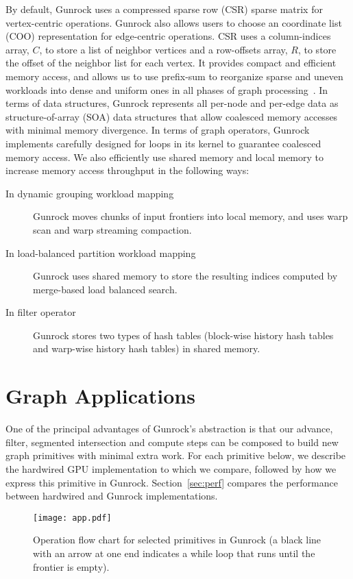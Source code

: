 \documentclass[format=acmsmall,review=false,screen=true]{acmart}
\begin{document}
By default, Gunrock uses a compressed sparse row (CSR) sparse matrix
for vertex-centric operations. Gunrock also allows users to choose an
coordinate list (COO) representation for edge-centric operations. CSR
uses a column-indices array, $C$, to store a list of neighbor vertices
and a row-offsets array, $R$, to store the offset of the neighbor list
for each vertex. It provides compact and efficient memory access, and
allows us to use prefix-sum to reorganize sparse and uneven workloads
into dense and uniform ones in all phases of graph
processing~\cite{Merrill:2012:SGG}. In terms of data structures,
Gunrock represents all per-node and per-edge data as
structure-of-array (SOA) data structures that allow coalesced memory
accesses with minimal memory divergence. In terms of graph operators,
Gunrock implements carefully designed for loops in its kernel to
guarantee coalesced memory access. We also efficiently use shared
memory and local memory to increase memory access throughput in the
following ways:
\begin{description}
\item[In dynamic grouping workload mapping] Gunrock moves chunks of
  input frontiers into local memory, and uses warp scan and warp
  streaming compaction.
\item[In load-balanced partition workload mapping] Gunrock uses shared
  memory to store the resulting indices computed by merge-based load
  balanced search.
\item[In filter operator] Gunrock stores two types of hash tables
  (block-wise history hash tables and warp-wise history hash tables)
  in shared memory.
\end{description}

\section{Graph Applications}
\label{sec:app}
One of the principal advantages of Gunrock's abstraction is that our
advance, filter, segmented intersection and compute steps can be composed to
build new graph primitives with minimal extra work. For each primitive
below, we describe the hardwired GPU implementation to which we
compare, followed by how we express this primitive in Gunrock.
Section~\ref{sec:perf} compares the performance between hardwired and
Gunrock implementations.

\begin{figure}[htb]
  \centering
  \texttt{[image: app.pdf]}
  \centering
  \caption{Operation flow chart for selected primitives in Gunrock (a
    black line with an arrow at one end indicates a while loop that
    runs until the frontier is empty).\label{fig:flow}}
\end{figure}
\end{document}
